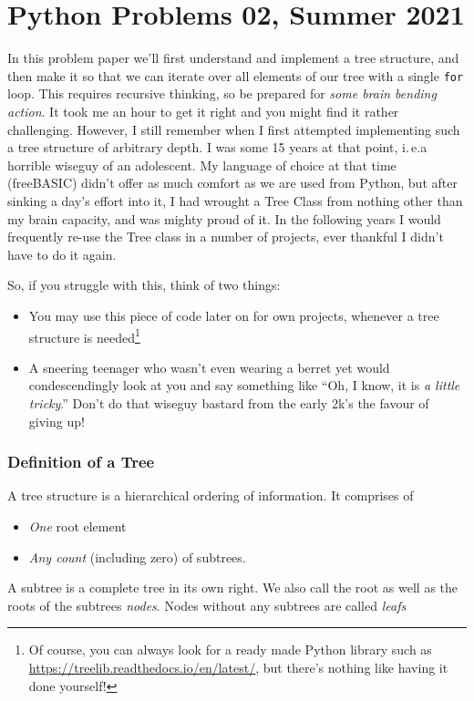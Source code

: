 \documentclass[
	english,
	fontsize=10pt,
	parskip=half,
	titlepage=true,
	DIV=12
]{scrartcl}
\newcommand*{\inPy}[1]{\texttt{#1}}
\newcommand*{\ie}{i.\,e.}
\begin{document}
\part*{Python Problems 02, Summer 2021}

In this problem paper we'll first understand and implement a tree structure, and then make it so that we can iterate over all elements of our tree with a single \inPy{for} loop. This requires recursive thinking, so be prepared for \emph{some brain bending action}. It took me an hour to get it right and you might find it rather challenging. However, I still remember when I first attempted implementing such a tree structure of arbitrary depth. I was some 15 years at that point, \ie a horrible wiseguy of an adolescent. My language of choice at that time (freeBASIC) didn't offer as much comfort as we are used from Python, but after sinking a day's effort into it, I had wrought a Tree Class from nothing other than my brain capacity, and was mighty proud of it. In the following years I would frequently re-use the Tree class in a number of projects, ever thankful I didn't have to do it again.

So, if you struggle with this, think of two things:
\begin{itemize}
\item You may use this piece of code later on for own projects, whenever a tree structure is needed\footnote{Of course, you can always look for a ready made Python 
	library such as \url{https://treelib.readthedocs.io/en/latest/}, but there's nothing like having it done yourself!}
\item A sneering teenager who wasn't even wearing a berret yet would condescendingly look at you and say something like \enquote{Oh, I know, it is \emph{a little
	tricky}.} Don't do that wiseguy bastard from the early 2k's the favour of giving up!
\end{itemize}

\section{Definition of a Tree}
A tree structure is a hierarchical ordering of information. It comprises of
\begin{itemize}
\item \emph{One} root element
\item \emph{Any count} (including zero) of subtrees.
\end{itemize}
A subtree is a complete tree in its own right. We also call the root as well as the roots of the subtrees \emph{nodes}. Nodes without any subtrees are called \emph{leafs}
\end{document}
